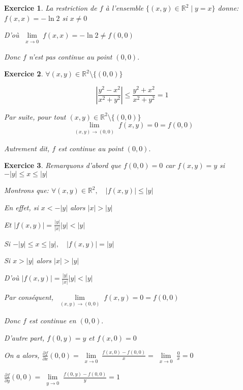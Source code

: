 \documentclass[11pt,a4paper]{report}
\newtheorem{exo}{Exercice}[section]
\begin{document}
\begin{exo}
La restriction de $f$ à l'ensemble $\{(x,y)\in\mathbb{R}^2\mid y=x\}$ donne:
$f(x,x)=-\ln 2$ si $x\neq0$

D'où $\lim\limits_{\substack{x \rightarrow 0}}f(x,x)=-\ln2\neq f(0,0)$

Donc $f$ n'est pas continue au point $(0,0).$
\end{exo}
\begin{exo}
$\forall(x,y)\in \mathbb{R}^2\setminus\{(0,0)\}$

$$|\frac{y^2- x^2}{x^2+y^2}|\leq\frac{y^2+x^2}{x^2+y^2}=1$$

Par suite, pour tout $(x,y)\in\mathbb{R}^2\setminus\{(0,0)\} $
$$\lim\limits_{\substack{(x,y) \rightarrow (0,0)}}f(x,y)=0=f(0,0)$$

Autrement dit, $f$ est continue au point $(0,0).$
\end{exo}
\begin{exo}
Remarquons d'abord que $f(0,0)=0$ car $f(x,y)=y$ si $-|y|\leq x\leq |y|$

Montrons que: $\forall(x,y)\in\mathbb{R}^2,\quad |f(x,y)|\leq|y|$

En effet, si $x<-|y|$ alors $|x|>|y|$

Et $|f(x,y)|=\frac{|y|}{|x|}|y|<|y|$

Si $-|y|\leq x\leq |y|,\quad |f(x,y)|=|y|$

Si $x>|y|$ alors $|x|>|y|$

D'où $|f(x,y)|=\frac{|y|}{|x|}|y|<|y|$

Par conséquent, $\lim\limits_{\substack{(x,y) \rightarrow (0,0)}}f(x,y)=0=f(0,0)$

Donc $f$ est continue en $(0,0).$

D'autre part, $f(0,y)=y$ et $f(x,0)=0$

On a alors, $\frac{\partial f}{\partial x}(0,0)=\lim\limits_{\substack{x\rightarrow0}}\frac{f(x,0)-f(0,0)}{x}=\lim\limits_{\substack{x\rightarrow0}}\frac{0}{x}=0$

$\frac{\partial f}{\partial y}(0,0)=\lim\limits_{\substack{y\rightarrow0}}\frac{f(0,y)-f(0,0)}{y}=1$
\end{exo}
\end{document}
